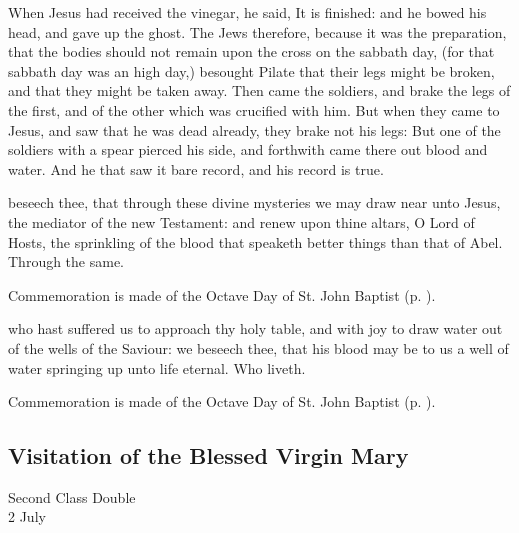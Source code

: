  When Jesus had received the vinegar, he said, It is finished: and he bowed his head, and gave up the ghost. The Jews therefore, because it was the preparation, that the bodies should not remain upon the cross on the sabbath day, (for that sabbath day was an high day,) besought Pilate that their legs might be broken, and that they might be taken away. Then came the soldiers, and brake the legs of the first, and of the other which was crucified with him. But when they came to Jesus, and saw that he was dead already, they brake not his legs: But one of the soldiers with a spear pierced his side, and forthwith came there out blood and water. And he that saw it bare record, and his record is true.


\secret
{} beseech thee, that through these divine mysteries we may draw near unto Jesus, the mediator of the new Testament: and renew upon thine altars, O Lord of Hosts, the sprinkling of the blood that speaketh better things than that of Abel. Through the same.

\begin{rubric}
    Commemoration is made of the Octave Day of St. John Baptist (p. \pageref{JohnSecret}).
\end{rubric}


\vspace{-0.2\baselineskip}

\postcommunion
{} who hast suffered us to approach thy holy table, and with joy to draw water out of the wells of the Saviour: we beseech thee, that his blood may be to us a well of water springing up unto life eternal. Who liveth.
\begin{rubric}
    Commemoration is made of the Octave Day of St. John Baptist (p. \pageref{JohnPC}).
\end{rubric}

\subsection{Visitation of the Blessed Virgin Mary}
\begin{inhead}
    {Second Class Double\\
2 July}
\end{inhead}

